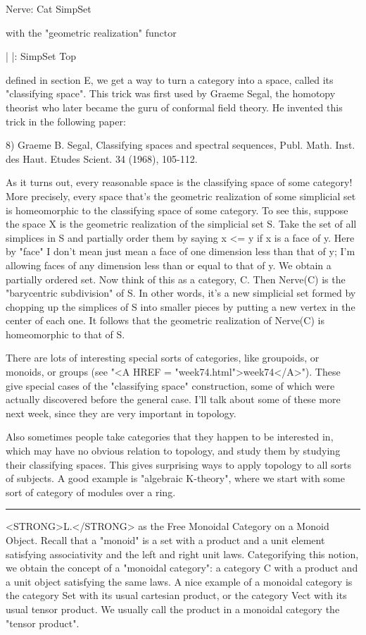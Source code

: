                 Nerve: Cat \to  SimpSet

with the "geometric realization" functor 

                | |: SimpSet \to  Top

defined in section E, we get a way to turn a category into a space, 
called its "classifying space".  This trick was first used by Graeme 
Segal, the homotopy theorist who later became the guru of conformal 
field theory.  He invented this trick in the following paper:

8) Graeme B. Segal, Classifying spaces and spectral sequences,
Publ. Math. Inst. des Haut. Etudes Scient. 34 (1968), 105-112.

As it turns out, every reasonable space is the classifying space of some
category!  More precisely, every space that's the geometric realization
of some simplicial set is homeomorphic to the classifying space of some
category.  To see this, suppose the space X is the geometric realization
of the simplicial set S.  Take the set of all simplices in S and
partially order them by saying x <= y if x is a face of y.  Here by
"face" I don't mean just mean a face of one dimension less than that of
y; I'm allowing faces of any dimension less than or equal to that of y.
We obtain a partially ordered set.  Now think of this as a category, C.
Then Nerve(C) is the "barycentric subdivision" of S.  In other words,
it's a new simplicial set formed by chopping up the simplices of S into
smaller pieces by putting a new vertex in the center of each one.  It
follows that the geometric realization of Nerve(C) is homeomorphic to
that of S.

There are lots of interesting special sorts of categories, like
groupoids, or monoids, or groups (see "<A HREF = "week74.html">week74</A>").  These give special
cases of the "classifying space" construction, some of which were
actually discovered before the general case.  I'll talk about some of
these more next week, since they are very important in topology.  

Also sometimes people take categories that they happen to be interested
in, which may have no obvious relation to topology, and study them by
studying their classifying spaces.  This gives surprising ways to apply
topology to all sorts of subjects.  A good example is "algebraic
K-theory", where we start with some sort of category of modules over a
ring.

\par\noindent\rule{\textwidth}{0.4pt}
<STRONG>L.</STRONG>  \Delta  as the Free Monoidal Category on a Monoid Object.  Recall that
a "monoid" is a set with a product and a unit element satisfying
associativity and the left and right unit laws.  Categorifying this
notion, we obtain the concept of a "monoidal category": a category C
with a product and a unit object satisfying the same laws.  A nice
example of a monoidal category is the category Set with its usual
cartesian product, or the category Vect with its usual tensor product.
We usually call the product in a monoidal category the "tensor product".

